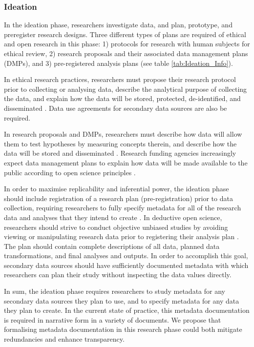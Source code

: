 \documentclass{isprs} %
\begin{document}
\subsubsection{Ideation}

In the ideation phase, researchers investigate data, and plan, prototype, and preregister research designs.
Three different types of plans are required of ethical and open research in this phase: 1) protocols for research with human subjects for ethical review, 2) research proposals and their associated data management plans (DMPs), and 3) pre-registered analysis plans (see table \ref{tab:Ideation_Info}).

In ethical research practices, researchers must propose their research protocol prior to collecting or analysing data, describe the analytical purpose of collecting the data, and explain how the data will be stored, protected, de-identified, and disseminated \citep{DHEW1978}.
Data use agreements for secondary data sources are also be required.

In research proposals and DMPs, researchers must describe how data will allow them to test hypotheses by measuring concepts therein, and describe how the data will be stored and disseminated \citep{NSF2021}.
Research funding agencies increasingly expect data management plans to explain how data will be made available to the public according to open science principles \citep{Gil2016}.

In order to maximise replicability and inferential power, the ideation phase should include registration of a research plan (pre-registration) prior to data collection, requiring researchers to fully specify metadata for all of the research data and analyses that they intend to create \citep{Nosek2018}.
In deductive open science, researchers should strive to conduct objective unbiased studies by avoiding viewing or manipulating research data prior to registering their analysis plan \cite{Nosek2018}.
The plan should contain complete descriptions of all data, planned data transformations, and final analyses and outputs.
In order to accomplish this goal, secondary data sources should have sufficiently documented metadata with which researchers can plan their study without inspecting the data values directly.

In sum, the ideation phase requires researchers to study metadata for any secondary data sources they plan to use, and to specify metadata for any data they plan to create.
In the current state of practice, this metadata documentation is required in narrative form in a variety of documents.
We propose that formalising metadata documentation in this research phase could both mitigate redundancies and enhance transparency.
\end{document}
